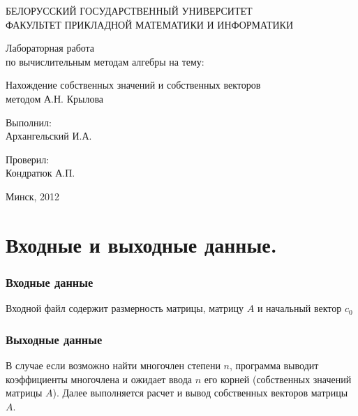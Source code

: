 \documentclass[a4paper,11pt]{article}
\author{Архангельский Илья}
\begin{document}
\begin{titlepage}
	\begin{center}
		БЕЛОРУССКИЙ ГОСУДАРСТВЕННЫЙ УНИВЕРСИТЕТ \\
		ФАКУЛЬТЕТ ПРИКЛАДНОЙ МАТЕМАТИКИ И ИНФОРМАТИКИ
	\end{center}
	\vspace{10em}
	\begin{center}
		\LARGE {Лабораторная работа \\
		по вычислительным методам алгебры на тему:}
		\linebreak	 
		
    Нахождение собственных значений и собственных векторов \\
    методом А.Н. Крылова
	\end{center}
	\vspace{3em}
	\begin{flushright}
	  
	
 	Выполнил: \\	Архангельский И.А. \\ 
 	
 	  \vspace{1em}
 	
 	  Проверил: \\ Кондратюк А.П. \\
 	
	\end{flushright}
	
	\vfill
	\begin{center}
		Минск, 2012
	\end{center}
\end{titlepage} 

\newpage
\part*{Входные и выходные данные.} 
\section*{Входные данные}

Входной файл содержит размерность матрицы,  матрицу $A$ и начальный вектор $c_0$
\section*{Выходные данные}
В случае если возможно найти многочлен степени $n$, программа выводит коэффициенты многочлена и ожидает ввода $n$ его корней (собственных значений матрицы $A$).
Далее выполняется расчет и вывод собственных векторов матрицы $A$.
\newpage 
\end{document}
